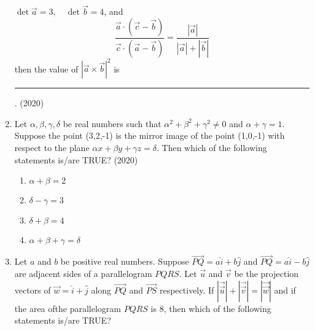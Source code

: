 \begin{enumerate}[label=\thesubsection.\arabic*.,ref=\thesubsection.\theenumi]
	$\det{\vec{a}}= 3, \quad \det{\vec{b}} = 4$, and 
$$\frac{\vec{a} \cdot (\vec{c} - \vec{b})}{\vec{c} \cdot (\vec{a} - \vec{b})} = \frac{|\vec{a}|}{|\vec{a}| + |\vec{b}|}$$
    then the value of $|\vec{a} \times \vec{b}|^2$ is \rule{1cm}{0.1pt}.
		\hfill (2020)
%
\item Let $\alpha,\beta,\gamma,\delta$ be real numbers such that $\alpha^2 + \beta^2 + \gamma^2 \neq 0$ and $\alpha + \gamma = 1$. Suppose the point (3,2,-1) is the mirror image of the point (1,0,-1) with respect to the plane ${\alpha}x + {\beta}y + {\gamma}z = \delta$. Then which of the following statements is/are TRUE?
\hfill (2020)
    \begin{multicols}{2} 
\begin{enumerate}
 \item $\alpha + \beta = 2$ 
 \item $\delta - \gamma = 3$
 \item $\delta + \beta = 4 $ 
 \item $\alpha + \beta + \gamma = \delta$
\end{enumerate}
    \end{multicols}
 \item Let $a$ and $b$ be positive real numbers. Suppose $\overrightarrow {PQ} = a\hat{i} + b\hat{j}$ and $\overrightarrow{PQ} = a\hat{i} - b\hat{j}$ are adjacent sides 
of a parallelogram $PQRS$. Let $\overrightarrow{u}$ and $\overrightarrow{v}$ be the projection vectors of $\overrightarrow{w} = \hat{i} + \hat{j}$ along $\overrightarrow{PQ}$ and $\overrightarrow{PS}$ respectively. If $|\vec{\overrightarrow{u}}| + |\vec{\overrightarrow{v}}| = |\vec{\overrightarrow{w}}|$ and if the area ofthe parallelogram $PQRS$ is 8, then which of the following statements is/are TRUE?


\end{enumerate}
